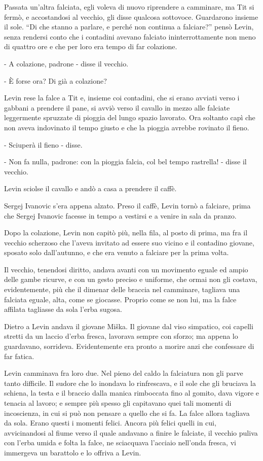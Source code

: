 Passata un'altra falciata, egli voleva di nuovo riprendere a camminare, ma Tit si fermò, e accostandosi al vecchio, gli disse qualcosa sottovoce. Guardarono insieme il sole. ``Di che stanno a parlare, e perché non continua a falciare?'' pensò Levin, senza rendersi conto che i contadini avevano falciato ininterrottamente non meno di quattro ore e che per loro era tempo di far colazione. 

- A colazione, padrone - disse il vecchio. 

- È forse ora? Di già a colazione? 

Levin rese la falce a Tit e, insieme coi contadini, che si erano avviati verso i gabbani a prendere il pane, si avviò verso il cavallo in mezzo alle falciate leggermente spruzzate di pioggia del lungo spazio lavorato. Ora soltanto capì che non aveva indovinato il tempo giusto e che la pioggia avrebbe rovinato il fieno. 

- Sciuperà il fieno - disse. 

- Non fa nulla, padrone: con la pioggia falcia, col bel tempo rastrella! - disse il vecchio. 

Levin sciolse il cavallo e andò a casa a prendere il caffè. 

Sergej Ivanovic s'era appena alzato. Preso il caffè, Levin tornò a falciare, prima che Sergej Ivanovic facesse in tempo a vestirsi e a venire in sala da pranzo. 

Dopo la colazione, Levin non capitò più, nella fila, al posto di prima, ma fra il vecchio scherzoso che l'aveva invitato ad essere suo vicino e il contadino giovane, sposato solo dall'autunno, e che era venuto a falciare per la prima volta. 

Il vecchio, tenendosi diritto, andava avanti con un movimento eguale ed ampio delle gambe ricurve, e con un gesto preciso e uniforme, che ormai non gli costava, evidentemente, più che il dimenar delle braccia nel camminare, tagliava una falciata eguale, alta, come se giocasse. Proprio come se non lui, ma la falce affilata tagliasse da sola l'erba sugosa. 

Dietro a Levin andava il giovane Miška. Il giovane dal viso simpatico, coi capelli stretti da un laccio d'erba fresca, lavorava sempre con sforzo; ma appena lo guardavano, sorrideva. Evidentemente era pronto a morire anzi che confessare di far fatica. 

Levin camminava fra loro due. Nel pieno del caldo la falciatura non gli parve tanto difficile. Il sudore che lo inondava lo rinfrescava, e il sole che gli bruciava la schiena, la testa e il braccio dalla manica rimboccata fino al gomito, dava vigore e tenacia al lavoro; e sempre più spesso gli capitavano quei tali momenti di incoscienza, in cui si può non pensare a quello che si fa. La falce allora tagliava da sola. Erano questi i momenti felici. Ancora più felici quelli in cui, avvicinandosi al fiume verso il quale andavano a finire le falciate, il vecchio puliva con l'erba umida e folta la falce, ne sciacquava l'acciaio nell'onda fresca, vi immergeva un barattolo e lo offriva a Levin. 

